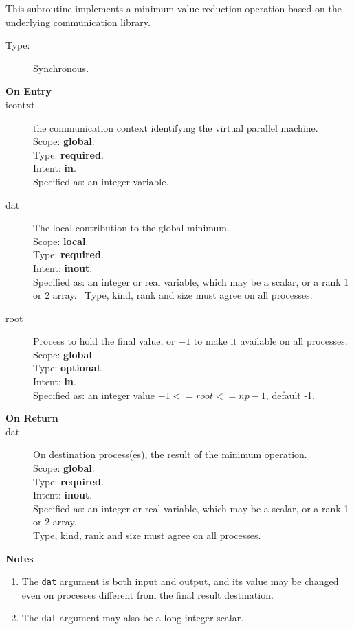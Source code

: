 This subroutine implements a minimum value reduction
operation based on the underlying communication library. 
\begin{description}
\item[Type:] Synchronous.
\item[\bf  On Entry ]
\item[icontxt] the communication context identifying the virtual
  parallel machine.\\
Scope: {\bf global}.\\
Type: {\bf required}.\\
Intent: {\bf in}.\\
Specified as: an integer variable.
\item[dat] The local contribution to the global minimum.\\
Scope: {\bf local}.\\
Type: {\bf required}.\\
Intent: {\bf inout}.\\
Specified as: an integer  or real variable, which may be a
scalar, or a rank 1 or 2 array. \
Type, kind, rank and size must agree on all processes.
\item[root] Process to hold the final value, or $-1$ to make it available
  on all processes.\\
Scope: {\bf global}.\\
Type: {\bf optional}.\\
Intent: {\bf in}.\\
Specified as: an integer value $-1<= root <= np-1$, default -1. \\
\end{description}


\begin{description}
\item[\bf On Return]
\item[dat] On destination process(es), the result of the minimum operation.\\
Scope: {\bf global}.\\
Type: {\bf required}.\\
Intent: {\bf inout}.\\
Specified as: an integer  or  real variable, which may be a
scalar, or a rank 1 or 2 array. \\
Type, kind, rank and size must agree on all processes.
\end{description}


{\par\noindent\large\bfseries Notes}
\begin{enumerate}
\item The \verb|dat| argument is both input and output, and its
  value may be changed even on processes different from the final
  result destination.
\item The \verb|dat| argument may also be a long integer scalar.
\end{enumerate}

